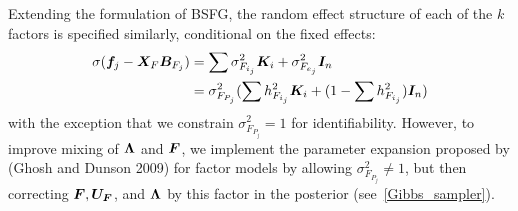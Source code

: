 \documentclass[11pt]{amsart}
\newcommand*{\B}[1]{\ifmmode\bm{#1}\else\textbf{#1}\fi}
\begin{document}
Extending the formulation of BSFG, the random effect structure of each of the $k$ factors is specified similarly, conditional on the fixed effects:
\begin{align} \begin{split}
\sigma(\B{f}_{j} - \B{X}_F\B{B}_{F_j} ) &= \sum \sigma^2_{F_{i_j}} \B{K}_i + \sigma^2_{F_{e_j}}\B{I}_n \\
&= \sigma^2_{F_{P_j}} (\sum h^2_{F_{i_j}} \B{K}_i + (1 - \sum h^2_{F_{i_j}})\B{I}_n) 
\end{split} \end{align}
\noindent with the exception that we constrain $\sigma^2_{F_{P_j}} = 1$ for identifiability. However, to improve mixing of $\B{\Lambda}$ and $\B{F}$, we implement the parameter expansion proposed by (Ghosh and Dunson 2009) for factor models by allowing $\sigma^2_{F_{P_j}} \neq1$, but then correcting $\B{F}, \B{U_F}$, and $\B{\Lambda}$ by this factor in the posterior (see~\ref{Gibbs_sampler}).
\end{document}
